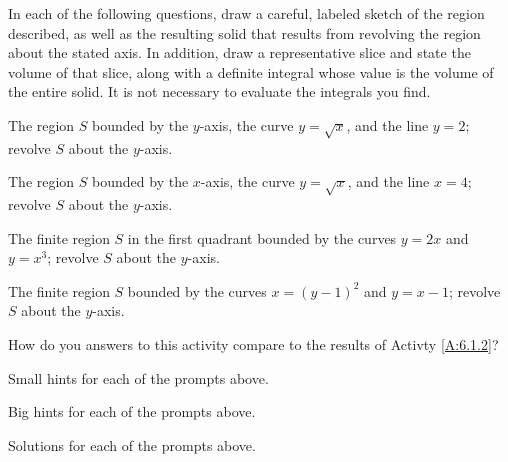 \begin{activity} \label{A:6.2.1}  
In each of the following questions, draw a careful, labeled sketch of the region described, as well as the resulting solid that results from revolving the region about the stated axis.  In addition, draw a representative slice and state the volume of that slice, along with a definite integral whose value is the volume of the entire solid.  It is not necessary to evaluate the integrals you find.
\ba
	\item The region $S$ bounded by the $y$-axis, the curve $y = \sqrt{x}$, and the line $y = 2$; revolve $S$ about the $y$-axis.
	\item The region $S$ bounded by the $x$-axis, the curve $y = \sqrt{x}$, and the line $x = 4$; revolve $S$ about the $y$-axis.
	\item The finite region $S$ in the first quadrant bounded by the curves $y = 2x$ and $y = x^3$; revolve $S$ about the $y$-axis.
	\item The finite region $S$ bounded by the curves $x = (y-1)^2$ and $y  = x-1$; revolve $S$ about the $y$-axis.
	\item How do you answers to this activity compare to the results of Activty \ref{A:6.1.2}?
\ea

\end{activity}
\begin{smallhint}
\ba
	\item Small hints for each of the prompts above.
\ea
\end{smallhint}
\begin{bighint}
\ba
	\item Big hints for each of the prompts above.
\ea
\end{bighint}
\begin{activitySolution}
\ba
	\item Solutions for each of the prompts above.
\ea
\end{activitySolution}
\aftera
